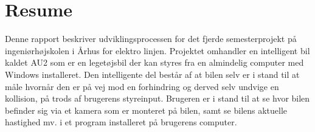 \chapter{Resume}
\label{ch:Resume}

Denne rapport beskriver udviklingsprocessen for det fjerde semesterprojekt på ingeniørhøjskolen i Århus for elektro linjen. Projektet omhandler en intelligent bil kaldet AU2 som er en legetøjsbil der kan styres fra en almindelig computer med Windows installeret. Den intelligente del består af at bilen selv er i stand til at måle hvornår den er på vej mod en forhindring og derved selv undvige en kollision, på trods af brugerens styreinput. Brugeren er i stand til at se hvor bilen befinder sig via et kamera som er monteret på bilen, samt se bilens aktuelle hastighed mv. i et program installeret på brugerens computer.
\clearpage